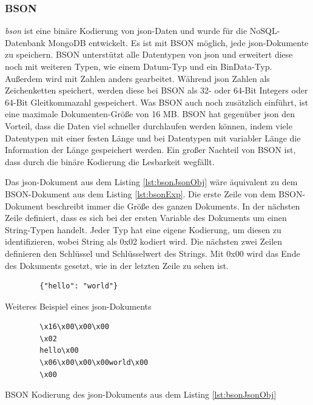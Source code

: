 \subsubsection{BSON}
\textit{\ac{bson}} ist eine binäre Kodierung von \ac{json}-Daten und wurde für die NoSQL-Datenbank MongoDB entwickelt. Es ist mit BSON möglich, jede \ac{json}-Dokumente zu speichern. BSON unterstützt alle Datentypen von \ac{json} und erweitert diese noch mit weiteren Typen, wie einem Datum-Typ und ein BinData-Typ. Außerdem wird mit Zahlen anders gearbeitet. Während \ac{json} Zahlen als Zeichenketten speichert, werden diese bei BSON als 32- oder 64-Bit Integers oder 64-Bit Gleitkommazahl gespeichert. Was BSON auch noch zusätzlich einführt, ist eine maximale Dokumenten-Größe von 16 MB. BSON hat gegenüber \ac{json} den Vorteil, dass die Daten viel schneller durchlaufen werden können, indem viele Datentypen mit einer festen Länge und bei Datentypen mit variabler Länge die Information der Länge gespeichert werden. Ein großer Nachteil von BSON ist, dass durch die binäre Kodierung die Lesbarkeit wegfällt.\cite{bsonspecBSONBinary}\cite{postgreSQLandBSON}\cite{mongodbJSONBSON}

Das \ac{json}-Dokument aus dem Listing \ref{lst:bsonJsonObj} wäre äquivalent zu dem BSON-Dokument aus dem Listing \ref{lst:bsonExp}. Die erste Zeile von dem BSON-Dokument beschreibt immer die Größe des ganzen Dokuments. In der nächsten Zeile definiert, dass es sich bei der ersten Variable des Dokuments um einen String-Typen handelt. Jeder Typ hat eine eigene Kodierung, um diesen zu identifizieren, wobei String als 0x02 kodiert wird. Die nächsten zwei Zeilen definieren den Schlüssel und Schlüsselwert des Strings. Mit 0x00 wird das Ende des Dokuments gesetzt, wie in der letzten Zeile zu sehen ist.

\begin{listing}[htp]
    \begin{verbatim}
        {"hello": "world"}
    \end{verbatim}
    \caption{Weiteres Beispiel eines \ac{json}-Dokuments \cite{mongodbJSONBSON}}
    \label{lst:bsonJsonObj}
\end{listing} 

\begin{listing}[htp]
    \begin{verbatim} 
        \x16\x00\x00\x00           
        \x02                      
        hello\x00                  
        \x06\x00\x00\x00world\x00  
        \x00                       
    \end{verbatim}
    \caption{BSON Kodierung des \ac{json}-Dokuments aus dem Listing \ref{lst:bsonJsonObj} \cite{mongodbJSONBSON}}
    \label{lst:bsonExp}
\end{listing}


